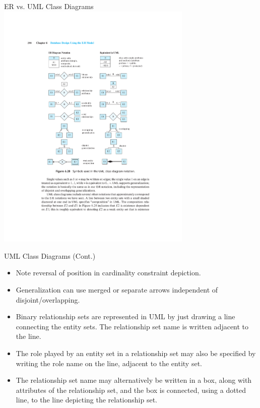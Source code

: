 \documentclass{beamer}
\begin{document}
\begin{frame}{ER vs. UML Class Diagrams}
    \centering
    \includegraphics[trim={5cm 9cm 3.63cm 4.6cm}, clip, width=0.7\textwidth]{figures/uml}
\end{frame}

\begin{frame}{UML Class Diagrams (Cont.)}
    \begin{itemize}
        \item Note reversal of position in cardinality constraint depiction.
        \item Generalization can use merged or separate arrows independent of disjoint/overlapping.
        \item Binary relationship sets are represented in UML by just drawing a line connecting the entity sets. The relationship set name is written adjacent to the line.
        \item The role played by an entity set in a relationship set may also be specified by writing the role name on the line, adjacent to the entity set.
        \item The relationship set name may alternatively be written in a box, along with attributes of the relationship set, and the box is connected, using a dotted line, to the line depicting the relationship set.
    \end{itemize}
\end{frame}
\end{document}
